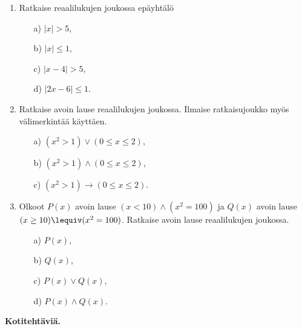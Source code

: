 \begin{enumerate}
\item
Ratkaise reaalilukujen joukossa epäyhtälö
\begin{itemize}
\item[a)] $|x| > 5$,
\item[b)] $|x| \le 1$,
\item[c)] $|x - 4| > 5$,
\item[d)] $|2x - 6| \le 1$.
\end{itemize}

\item Ratkaise avoin lause reaalilukujen joukossa. Ilmaise ratkaisujoukko myös välimerkintää käyttäen.
\begin{itemize}
\item[a)] $(x^2 > 1) \lor (0 \le x \le 2)$,
\item[b)] $(x^2 > 1) \land (0 \le x \le 2)$,
\item[c)] $(x^2 > 1) \to (0 \le x \le 2)$.
\end{itemize}

\item
Olkoot $P(x)$ avoin lause $(x < 10) \land (x^2 = 100)$ ja
$Q(x)$ avoin lause $(x \ge 10) \lequiv (x^2 = 100)$. Ratkaise avoin lause reaalilukujen joukossa.
\begin{itemize}
\item[a)] $P(x)$,
\item[b)] $Q(x)$,
\item[c)] $P(x) \lor Q(x)$,
\item[d)] $P(x) \land Q(x)$.
\end{itemize}


\end{enumerate}

{\bf Kotitehtäviä.}

